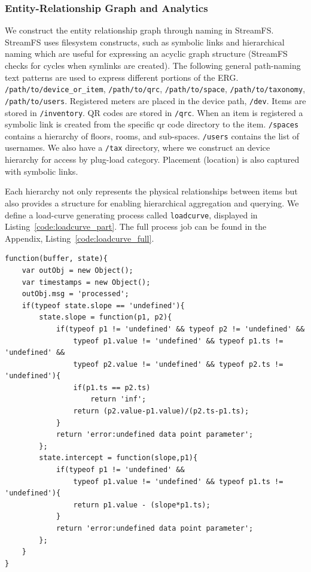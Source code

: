 \subsubsection{Entity-Relationship Graph and Analytics}
We construct the entity relationship graph through naming in StreamFS.  StreamFS uses filesystem constructs, such as symbolic
links and hierarchical naming which are useful for expressing an acyclic graph structure (StreamFS checks for cycles when symlinks 
are created).  
The following general path-naming text patterns are used to express different portions of the ERG.
\texttt{/path/to/device\_or\_item}, 
\texttt{/path/to/qrc}, \texttt{/path/to/space}, \texttt{/path/to/taxonomy}, \texttt{/path/to/users}.  
Registered meters are placed in the device path, \texttt{/dev}.  Items are stored in \texttt{/inventory}.  QR codes are stored 
in \texttt{/qrc}.  When an item is registered a 
symbolic link is created from the specific qr code directory to the item.  \texttt{/spaces} contains a hierarchy of floors, rooms, 
and sub-spaces.  \texttt{/users} contains the list of usernames.  We also have a \texttt{/tax} directory, where we construct an
device hierarchy for access by plug-load category.  Placement (location) is also captured with symbolic links. 

Each hierarchy not only represents the physical relationships between items but also provides a structure for 
enabling hierarchical aggregation and querying.  We define a load-curve generating process called \texttt{loadcurve}, displayed in 
Listing~\ref{code:loadcurve_part}.  The full process job can be found in the Appendix, Listing~\ref{code:loadcurve_full}.

\begin{lstlisting}[caption={Partial load curve code used to generate aggregate load curves in the Energy Lens application.},label={code:loadcurve_part}]
function(buffer, state){
    var outObj = new Object();
    var timestamps = new Object();
    outObj.msg = 'processed';
    if(typeof state.slope == 'undefined'){
        state.slope = function(p1, p2){
            if(typeof p1 != 'undefined' && typeof p2 != 'undefined' &&
                typeof p1.value != 'undefined' && typeof p1.ts != 'undefined' &&
                typeof p2.value != 'undefined' && typeof p2.ts != 'undefined'){
                if(p1.ts == p2.ts)
                    return 'inf';
                return (p2.value-p1.value)/(p2.ts-p1.ts);
            }
            return 'error:undefined data point parameter';
        };
        state.intercept = function(slope,p1){
            if(typeof p1 != 'undefined' &&
                typeof p1.value != 'undefined' && typeof p1.ts != 'undefined'){
                return p1.value - (slope*p1.ts);
            }
            return 'error:undefined data point parameter';
        };
    }
}
\end{lstlisting}

